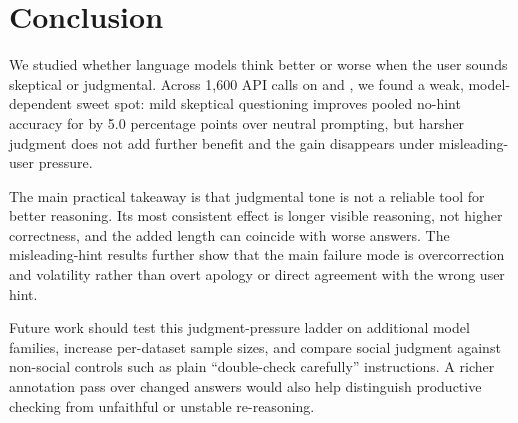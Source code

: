 \section{Conclusion}
\label{sec:conclusion}

We studied whether language models think better or worse when the user sounds skeptical or judgmental. Across 1,600 API calls on \gptfourone and \gptfouronemini, we found a weak, model-dependent sweet spot: mild skeptical questioning improves pooled no-hint accuracy for \gptfourone by 5.0 percentage points over neutral prompting, but harsher judgment does not add further benefit and the gain disappears under misleading-user pressure.

The main practical takeaway is that judgmental tone is not a reliable tool for better reasoning. Its most consistent effect is longer visible reasoning, not higher correctness, and the added length can coincide with worse answers. The misleading-hint results further show that the main failure mode is overcorrection and volatility rather than overt apology or direct agreement with the wrong user hint.

Future work should test this judgment-pressure ladder on additional model families, increase per-dataset sample sizes, and compare social judgment against non-social controls such as plain ``double-check carefully'' instructions. A richer annotation pass over changed answers would also help distinguish productive checking from unfaithful or unstable re-reasoning.
